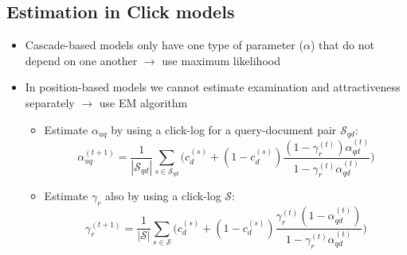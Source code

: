 \subsection{Estimation in Click models}
\begin{itemize}
	\item Cascade-based models only have one type of parameter ($\alpha$) that do not depend on one another $\rightarrow$ use maximum likelihood
	\item In position-based models we cannot estimate examination and attractiveness separately $\rightarrow$ use EM algorithm
	\begin{itemize}
		\item Estimate $\alpha_{uq}$ by using a click-log for a query-document pair $\mathcal{S}_{qd}$:
		$$ \alpha_{uq}^{(t+1)} = \dfrac{1}{|\mathcal{S}_{qd}|} \sum_{s \in \mathcal{S}_{qd}} \Big( c_d^{(s)} + (1 - c_d^{(s)}) \dfrac{(1- \gamma_r^{(t)}) \alpha_{qd}^{(t)}}{1 - \gamma_r^{(t)} \alpha_{qd}^{(t)}} \Big) $$
		\item Estimate $\gamma_r$ also by using a click-log $\mathcal{S}$:
		$$ \gamma_{r}^{(t+1)} = \dfrac{1}{|\mathcal{S}|} \sum_{s \in \mathcal{S}} \Big( c_d^{(s)} + (1 - c_d^{(s)}) \dfrac{\gamma_r^{(t)} (1 - \alpha_{qd}^{(t)})}{1 - \gamma_r^{(t)} \alpha_{qd}^{(t)}} \Big) $$
	\end{itemize}
\end{itemize}
